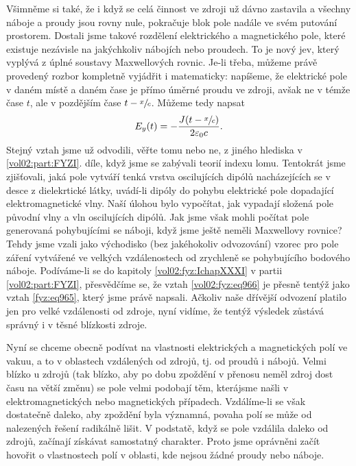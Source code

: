     Všimněme si také, že i když se celá činnost ve zdroji už dávno zastavila a všechny náboje a
    proudy jsou rovny nule, pokračuje blok pole nadále ve svém putování prostorem. Dostali jsme
    takové rozdělení elektrického a magnetického pole, které existuje nezávisle na jakýchkoliv
    nábojích nebo proudech. To je nový jev, který vyplývá z úplné soustavy Maxwellových rovnic.
    Je-li třeba, můžeme právě provedený rozbor kompletně vyjádřit i matematicky: napíšeme, že
    elektrické pole v daném místě a daném čase je přímo úměrné proudu ve zdroji, avšak ne v témže
    čase \(t\), ale v pozdějším čase \(t-\sfrac{x}{c}\). Můžeme tedy napsat
    \begin{equation}\label{fyz:eq965}
      E_y(t)=-\dfrac{J(t-\sfrac{x}{c})}{2\varepsilon_0 c}.
    \end{equation}
    Stejný vztah jsme už odvodili, věřte tomu nebo ne, z jiného hlediska v \ref{vol02:part:FYZI}.
    díle, když jsme se zabývali teorií indexu lomu. Tentokrát jsme zjišťovali, jaká pole vytváří
    tenká vrstva oscilujících dipólů nacházejících se v desce z dielekrtické látky, uvádí-li dipóly
    do pohybu elektrické pole dopadající elektromagnetické vlny. Naší úlohou bylo vypočítat, jak
    vypadají složená pole původní vlny a vln oscilujících dipólů. Jak jsme však mohli počítat pole
    generovaná pohybujícími se náboji, když jsme ještě neměli Maxwellovy rovnice? Tehdy jsme vzali
    jako východisko (bez jakéhokoliv odvozování) vzorec pro pole záření vytvářené ve velkých
    vzdálenostech od zrychleně se pohybujícího bodového náboje. Podíváme-li se do kapitoly
    \ref{vol02:fyz:IchapXXXI} v partii \ref{vol02:part:FYZI}, přesvědčíme se, že vztah
    \eqref{vol02:fyz:eq966} je přesně tentýž jako vztah \eqref{fyz:eq965}, který jsme právě napsali.
    Ačkoliv naše dřívější odvození platilo jen pro velké vzdálenosti od zdroje, nyní vidíme, že
    tentýž výsledek zůstává správný i v těsné blízkosti zdroje.

    Nyní se chceme obecně podívat na vlastnosti elektrických a magnetických polí ve vakuu, a to v
    oblastech vzdálených od zdrojů, tj. od proudů i nábojů. Velmi blízko u zdrojů (tak blízko, aby
    po dobu zpoždění v přenosu neměl zdroj dost času na větší změnu) se pole velmi podobají těm,
    kterájsme našli v elektromagnetických nebo magnetických případech. Vzdálíme-li se však
    dostatečně daleko, aby zpoždění byla významná, povaha polí se může od nalezených řešení
    radikálně lišit. V podstatě, když se pole vzdálila daleko od zdrojů, začínají získávat
    samostatný charakter. Proto jsme oprávněni začít hovořit o vlastnostech polí v oblasti, kde
    nejsou žádné proudy nebo náboje.
    
